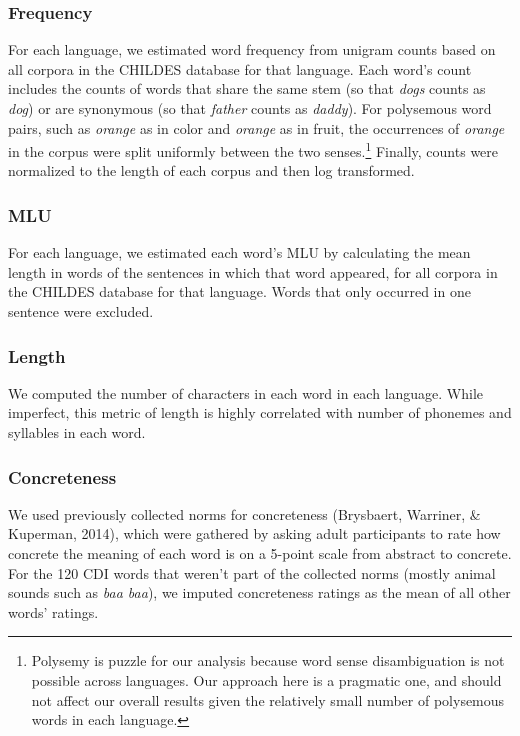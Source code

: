 \documentclass[10pt, letterpaper]{article}
\begin{document}
\subsubsection{Frequency}\label{frequency}

For each language, we estimated word frequency from unigram counts based
on all corpora in the CHILDES database for that language. Each word's
count includes the counts of words that share the same stem (so that
\emph{dogs} counts as \emph{dog}) or are synonymous (so that
\emph{father} counts as \emph{daddy}). For polysemous word pairs, such
as \emph{orange} as in color and \emph{orange} as in fruit, the
occurrences of \emph{orange} in the corpus were split uniformly between
the two
senses.\footnote{Polysemy is puzzle for our analysis because word sense disambiguation is not possible across languages. Our approach here is a pragmatic one, and should not affect our overall results given the relatively small number of polysemous words in each language.}
Finally, counts were normalized to the length of each corpus and then
log transformed.

\subsubsection{MLU}\label{mlu}

For each language, we estimated each word's MLU by calculating the mean
length in words of the sentences in which that word appeared, for all
corpora in the CHILDES database for that language. Words that only
occurred in one sentence were excluded.

\subsubsection{Length}\label{length}

We computed the number of characters in each word in each language.
While imperfect, this metric of length is highly correlated with number
of phonemes and syllables in each word.

\subsubsection{Concreteness}\label{concreteness}

We used previously collected norms for concreteness (Brysbaert,
Warriner, \& Kuperman, 2014), which were gathered by asking adult
participants to rate how concrete the meaning of each word is on a
5-point scale from abstract to concrete. For the 120 CDI words that
weren't part of the collected norms (mostly animal sounds such as
\emph{baa baa}), we imputed concreteness ratings as the mean of all
other words' ratings.
\end{document}
